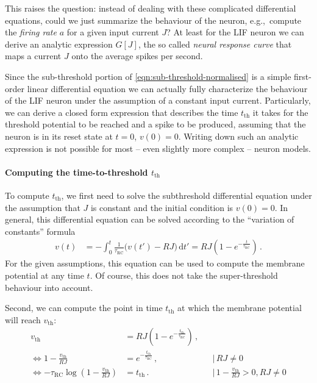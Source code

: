 \documentclass[10pt,letterpaper,oneside]{article}
\begin{document}
This raises the question: instead of dealing with these complicated differential equations, could we just summarize the behaviour of the neuron, e.g.,~compute the \emph{firing rate} $a$ for a given input current $J$? At least for the LIF neuron we can derive an analytic expression $G[J]$, the so called \emph{neural response curve} that maps a current $J$ onto the average spikes per second.


Since the sub-threshold portion of \cref{eqn:sub-threshold-normalised} is a simple first-order linear differential equation we can actually fully characterize the behaviour of the LIF neuron under the assumption of a constant input current. Particularly, we can derive a closed form expression that describes the time $t_\mathrm{th}$ it takes for the threshold potential to be reached and a spike to be produced, assuming that the neuron is in its reset state at $t=0$, $v(0) = 0$. Writing down such an analytic expression is not possible for most -- even slightly more complex -- neuron models.

\paragraph{Computing the time-to-threshold $t_\mathrm{th}$}
To compute $t_\mathrm{th}$, we first need to solve the subthreshold differential equation under the assumption that $J$ is constant and the initial condition is $v(0) = 0$. In general, this differential equation can be solved according to the \enquote{variation of constants} formula
\begin{align*}
	v(t) &= - \int_0^t \frac{1}{\tau_\mathrm{RC}} \big( v(t') - RJ \big) \,\mathrm{d}t'
	      = RJ \left(1 - e^{-\frac{t}{\tau_\mathrm{RC}}} \right) \,.
\end{align*}
For the given assumptions, this equation can be used to compute the membrane potential at any time $t$. Of course, this does not take the super-threshold behaviour into account.

Second, we can compute the point in time $t_\mathrm{th}$ at which the membrane potential will reach $v_\mathrm{th}$:
\begin{align*}
	v_\mathrm{th} &= RJ \left(1 - e^{-\frac{t_\mathrm{th}}{\tau_\mathrm{RC}}} \right) \,, \\
	\Leftrightarrow 1 - \frac{v_\mathrm{th}}{RJ} &= e^{-\frac{t_\mathrm{th}}{\tau_\mathrm{RC}}} \,, && \Big| \, RJ \neq 0 \\
	\Leftrightarrow - \tau_\mathrm{RC} \log \left( 1 - \frac{v_\mathrm{th}}{RJ} \right) &= t_\mathrm{th} \,.  && \Big| \, 1 - \frac{v_\mathrm{th}}{RJ} > 0 , RJ \neq 0
\end{align*}
\end{document}
